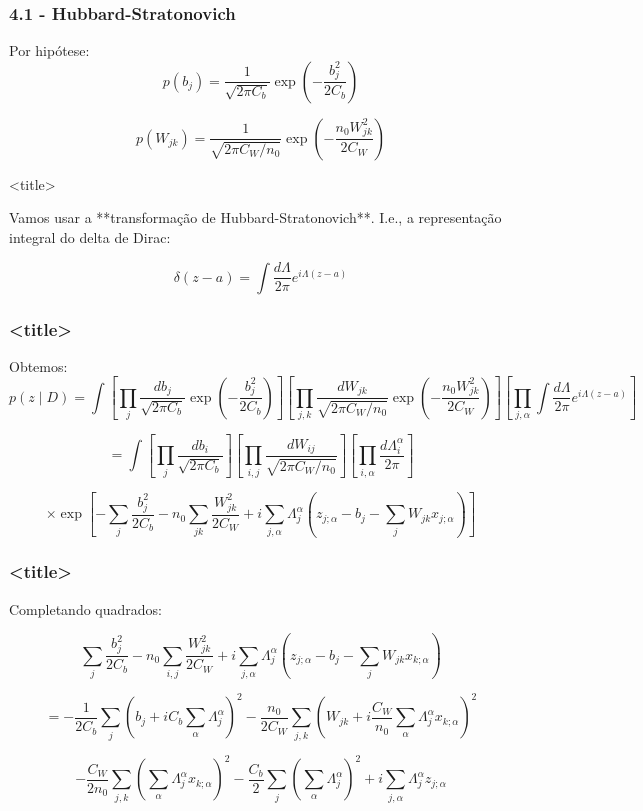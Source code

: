 \documentclass{beamer}
\begin{document}
\begin{frame}
    \frametitle{4.1 - Hubbard-Stratonovich}

    Por hipótese:
    $$
    p(b_j) = \frac{1}{\sqrt{2\pi C_b}} \exp(-\frac{b_j^2}{2C_b})
    $$

    $$
    p(W_{jk}) = \frac{1}{\sqrt{2\pi C_W/n_0}} \exp(-\frac{n_0 W_{jk}^2}{2C_W})
    $$

\end{frame}

\begin{frame}{<title>}

    Vamos usar a **transformação de Hubbard-Stratonovich**. I.e., a representação integral do delta de Dirac:

    $$
    \delta(z-a) = \int \frac{d\Lambda}{2\pi}e^{i\Lambda (z-a)}
    $$

\end{frame}

\begin{frame}
    \frametitle{<title>}

    Obtemos:
    \tiny
    $$
    p(z \mid D) = \int \left[ \prod_j \frac{db_j}{\sqrt{2\pi C_b}} \exp(-\frac{b_j^2}{2C_b}) \right] 
    \left[ \prod_{j,k} \frac{dW_{jk}}{\sqrt{2\pi C_W/n_0}} \exp(-\frac{n_0 W_{jk}^2}{2C_W}) \right] 
    \left[\prod_{j,\alpha}  \int \frac{d\Lambda}{2\pi}e^{i\Lambda (z-a)} \right]
    $$

    \pause

    $$
    = \int \left[ \prod_j \frac{db_i}{\sqrt{2\pi C_b}} \right]
    \left[ \prod_{i,j} \frac{dW_{ij}}{\sqrt{2\pi C_W / n_0}} \right]
    \left[ \prod_{i,\alpha} \frac{d\Lambda_{i}^{\alpha}}{2\pi} \right]
    $$

    $$
    \times \exp \left[
    - \sum_j \frac{b_j^2}{2C_b}
    - n_0 \sum_{jk} \frac{W_{jk}^2}{2C_W}
    + i \sum_{j,\alpha} \Lambda_{j}^{\alpha} 
    \left( z_{j;\alpha} - b_j - \sum_j W_{jk} x_{j;\alpha} \right)
    \right] 
    $$

\end{frame}

\begin{frame}
    \frametitle{<title>}

    Completando quadrados:

    $$
    \sum_j \frac{b_j^2}{2C_b}
    - n_0 \sum_{i,j} \frac{W_{jk}^2}{2C_W}
    + i \sum_{j,\alpha} \Lambda_{j}^{\alpha} 
    \left( z_{j;\alpha} - b_j - \sum_j W_{jk} x_{k;\alpha} \right)
    $$

    $$
    = -\frac{1}{2C_b} \sum_j \left( b_j + i C_b \sum_\alpha \Lambda_{j}^{\alpha} \right)^2
    - \frac{n_0}{2C_W} \sum_{j,k} \left( W_{jk} + i \frac{C_W}{n_0} \sum_\alpha \Lambda_{j}^{\alpha} x_{k;\alpha} \right)^2 
    $$

    $$
    - \frac{C_W}{2n_0} \sum_{j,k} \left( \sum_\alpha \Lambda_{j}^{\alpha} x_{k;\alpha} \right)^2
    - \frac{C_b}{2} \sum_j \left( \sum_\alpha \Lambda_{j}^{\alpha} \right)^2
    + i \sum_{j,\alpha} \Lambda_{j}^{\alpha} z_{j;\alpha} 
    $$

\end{frame}
\end{document}
